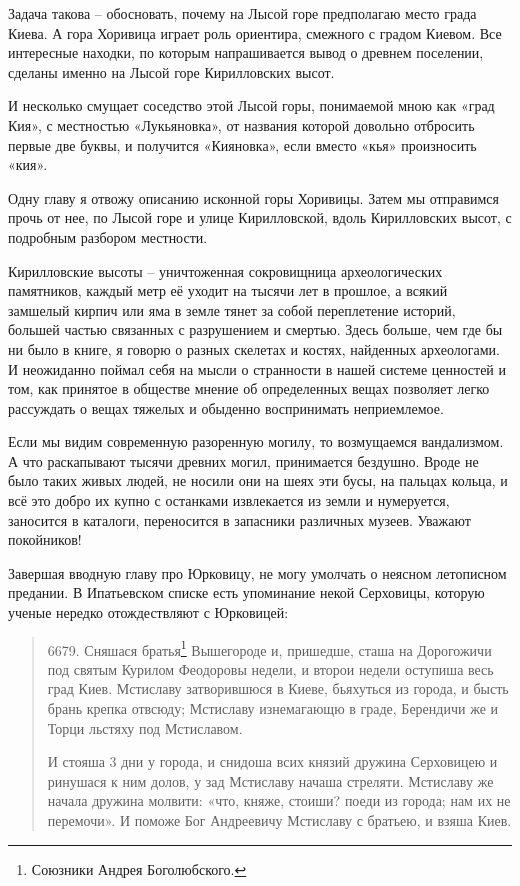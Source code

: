 Задача такова – обосновать, почему на Лысой горе предполагаю место града Киева. А гора Хоривица играет роль ориентира, смежного с градом Киевом. Все интересные находки, по которым напрашивается вывод о древнем поселении, сделаны именно на Лысой горе Кирилловских высот. 

И несколько смущает соседство этой Лысой горы, понимаемой мною как «град Кия», с местностью «Лукьяновка», от названия которой довольно отбросить первые две буквы, и получится «Кияновка», если вместо «кья» произносить «кия». 

Одну главу я отвожу описанию исконной горы Хоривицы. Затем мы отправимся прочь от нее, по Лысой горе и улице Кирилловской, вдоль Кирилловских высот, с подробным разбором местности. 

Кирилловские высоты – уничтоженная сокровищница археологических памятников, каждый метр её уходит на тысячи лет в прошлое, а всякий замшелый кирпич или яма в земле тянет за собой переплетение историй, большей частью связанных с разрушением и смертью. Здесь больше, чем где бы ни было в книге, я говорю о разных скелетах и костях, найденных археологами. И неожиданно поймал себя на мысли о странности в нашей системе ценностей и том, как принятое в обществе мнение об определенных вещах позволяет легко рассуждать о вещах тяжелых и обыденно воспринимать неприемлемое.

Если мы видим современную разоренную могилу, то возмущаемся вандализмом. А что раскапывают тысячи древних могил, принимается бездушно. Вроде не было таких живых людей, не носили они на шеях эти бусы, на пальцах кольца, и всё это добро их купно с останками извлекается из земли и нумеруется, заносится в каталоги, переносится в запасники различных музеев. Уважают покойников!

Завершая вводную главу про Юрковицу, не могу умолчать о неясном летописном предании. В Ипатьевском списке есть упоминание некой Серховицы, которую ученые нередко отождествляют с Юрковицей:

\begin{quotation}
6679. Сняшася братья\footnote{Союзники Андрея Боголюбского.} Вышегороде и, пришедше, сташа на Дорогожичи под святым Курилом Феодоровы недели, и второи недели оступиша весь град Киев. Мстиславу затворившюся в Киеве, бьяхуться из города, и бысть брань крепка отвсюду; Мстиславу изнемагающю в граде, Берендичи же и Торци льстяху под Мстиславом. 

И стояша 3 дни у города, и снидоша всих князий дружина Серховицею и ринушася к ним долов, у зад Мстиславу начаша стреляти. Мстиславу же начала дружина молвити: «что, княже, стоиши? поеди из города; нам их не перемочи». И поможе Бог Андреевичу Мстиславу с братьею, и взяша Киев.
\end{quotation}

